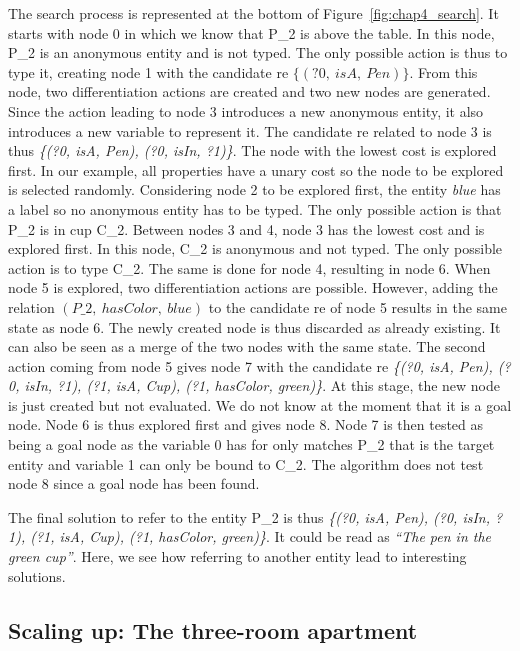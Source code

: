 The search process is represented at the bottom of Figure~\ref{fig:chap4_search}. It starts with node 0 in which we know that P\_2 is above the table. In this node, P\_2 is an anonymous entity and is not typed. The only possible action is thus to type it, creating node 1 with the candidate \acrshort{re} $\{(?0,\ isA,\ Pen)\}$. From this node, two differentiation actions are created and two new nodes are generated. Since the action leading to node 3 introduces a new anonymous entity, it also introduces a new variable to represent it. The candidate \acrshort{re} related to node 3 is thus \textit{\{(?0, isA, Pen), (?0, isIn, ?1)\}}. The node with the lowest cost is explored first. In our example, all properties have a unary cost so the node to be explored is selected randomly. Considering node 2 to be explored first, the entity \textit{blue} has a label so no anonymous entity has to be typed. The only possible action is that P\_2 is in cup C\_2. Between nodes 3 and 4, node 3 has the lowest cost and is explored first. In this node, C\_2 is anonymous and not typed. The only possible action is to type C\_2. The same is done for node 4, resulting in node 6. When node 5 is explored, two differentiation actions are possible. However, adding the relation $(P\_2,\ hasColor,\ blue)$ to the candidate \acrshort{re} of node 5 results in the same state as node 6. The newly created node is thus discarded as already existing. It can also be seen as a merge of the two nodes with the same state. The second action coming from node 5 gives node 7 with the candidate \acrshort{re} \textit{\{(?0, isA, Pen), (?0, isIn, ?1), (?1, isA, Cup), (?1, hasColor, green)\}}. At this stage, the new node is just created but not evaluated. We do not know at the moment that it is a goal node. Node 6 is thus explored first and gives node 8. Node 7 is then tested as being a goal node as the variable 0 has for only matches P\_2 that is the target entity and variable 1 can only be bound to C\_2. The algorithm does not test node 8 since a goal node has been found.

The final solution to refer to the entity P\_2 is thus \textit{\{(?0, isA, Pen), (?0, isIn, ?1), (?1, isA, Cup), (?1, hasColor, green)\}}. It could be read as \textit{``The pen in the green cup''}. Here, we see how referring to another entity lead to interesting solutions.


\subsection{Scaling up: The three-room apartment}

